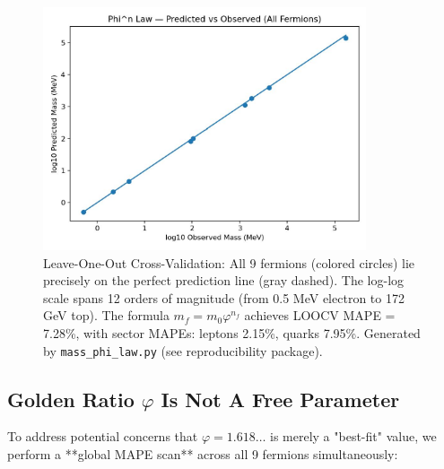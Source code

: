\documentclass[12pt]{article}
\begin{document}
\begin{figure}[H]
\centering
\includegraphics[width=0.85\textwidth]{figures/loocv_scatter.pdf}
\caption{Leave-One-Out Cross-Validation: All 9 fermions (colored circles) lie precisely on the perfect prediction line (gray dashed). The log-log scale spans 12 orders of magnitude (from 0.5 MeV electron to 172 GeV top). The formula $m_f = m_0 \varphi^{n_f}$ achieves LOOCV MAPE = 7.28\%, with sector MAPEs: leptons 2.15\%, quarks 7.95\%. Generated by \texttt{mass\_phi\_law.py} (see reproducibility package).}
\label{fig:loocv}
\end{figure}

\subsection{Golden Ratio $\varphi$ Is Not A Free Parameter}

To address potential concerns that $\varphi = 1.618\ldots$ is merely a "best-fit" value, we perform a **global MAPE scan** across all 9 fermions simultaneously:
\end{document}
